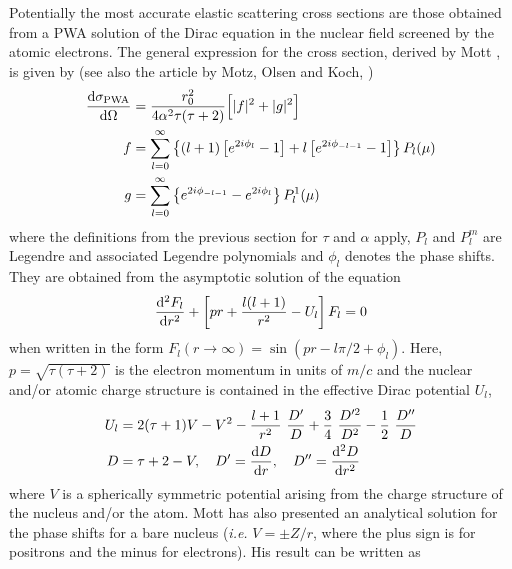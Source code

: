 Potentially the most accurate elastic scattering cross sections 
are those obtained from a PWA solution of the Dirac equation 
in the nuclear field screened by the atomic electrons. 
The general expression for the cross section, derived by Mott \cite{Mo29},
is given by (see also the article by Motz, Olsen and Koch, \cite{Mo64})
\begin{equation}
\label{mott1}
\begin{split}
{{\rm d}\sigma_{\rm PWA} \over {\rm d}\Omega} & = {r_0^2 \over 4 \alpha^2 \tau 
(\tau + 2) } \Big[ |f|^2 + |g|^2 \Big] \\
f & = \sum_{l=0}^\infty \left\{ (l+1) \left[ e^{2 i \phi_l} - 1 \right] 
+ l \left[ e^{2 i \phi_{-l-1}} - 1 \right] \right\} P_l(\mu) \\
g & = \sum_{l=0}^\infty \left\{ e^{2 i \phi_{-l-1}} - e^{2 i \phi_l} \right\} 
P_l^1(\mu)
\end{split}
\end{equation}
where the definitions from the previous section for $\tau$ and $\alpha$ 
apply, $P_l$ and $P_l^m$ are Legendre and associated Legendre polynomials 
and $\phi_l$ denotes the phase shifts. They are obtained from 
the asymptotic solution of the equation 
\begin{equation}
\label{mott2}
{{\rm d}^2 F_l \over {\rm d}r^2} + \left[ p r + {l (l+1) \over r^2} 
- U_l \right] F_l = 0
\end{equation}
when written in the form $F_l(r \to \infty) = \sin(p r - l \pi/2 + \phi_l)$. 
Here, $p = \sqrt{\tau (\tau+2)}$ is the electron momentum in units 
of $m/c$ and the nuclear and/or atomic charge structure 
is contained in the effective Dirac potential $U_l$,
\begin{equation}
\label{mott3}
\begin{split}
U_l & = 2 (\tau + 1) V - V^2 - {l+1 \over r^2}~{D' \over D} + 
\frac{3}{4}~{D^{\prime 2} \over D^2} - \frac{1}{2}~
\frac{D^{\prime \prime}}{D} \\
D & = \tau + 2 - V, \quad D' = {{\rm d} D \over {\rm d}r}, \quad 
D^{\prime \prime} = {{\rm d}^2 D \over {\rm d}r^2}
\end{split}
\end{equation}
where $V$ is a spherically symmetric potential arising from the 
charge structure of the nucleus and/or the atom. 
Mott has also presented \cite{Mo32} an analytical solution for the 
phase shifts for a bare nucleus ({\em i.e.} $V = \pm Z/r$, where 
the plus sign is for positrons and the minus 
for electrons). His result can be written as \cite{Mo64}
